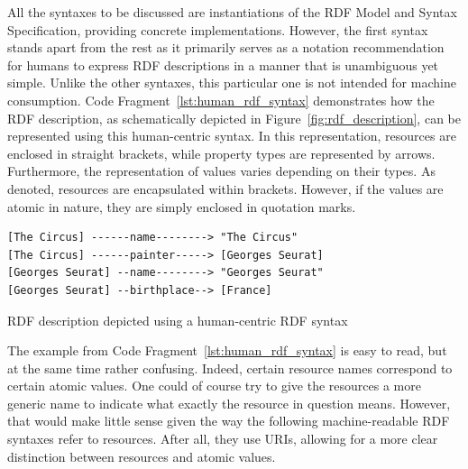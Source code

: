 All the syntaxes to be discussed are instantiations of the RDF Model and Syntax Specification, providing concrete implementations. However, the first syntax stands apart from the rest as it primarily serves as a notation recommendation for humans to express RDF descriptions in a manner that is unambiguous yet simple. Unlike the other syntaxes, this particular one is not intended for machine consumption. Code Fragment~\ref{lst:human_rdf_syntax} demonstrates how the RDF description, as schematically depicted in Figure~\ref{fig:rdf_description}, can be represented using this human-centric syntax. In this representation, resources are enclosed in straight brackets, while property types are represented by arrows. Furthermore, the representation of values varies depending on their types. As denoted, resources are encapsulated within brackets. However, if the values are atomic in nature, they are simply enclosed in quotation marks. \citep{miller1998introduction}

\begin{listing}[htbp]
    \begin{verbatim}
[The Circus] ------name--------> "The Circus"
[The Circus] ------painter-----> [Georges Seurat]
[Georges Seurat] --name--------> "Georges Seurat"
[Georges Seurat] --birthplace--> [France]
    \end{verbatim}
    \caption{RDF description depicted using a human-centric RDF syntax}
    \label{lst:human_rdf_syntax}
\end{listing}

The example from Code Fragment~\ref{lst:human_rdf_syntax} is easy to read, but at the same time rather confusing. Indeed, certain resource names correspond to certain atomic values. One could of course try to give the resources a more generic name to indicate what exactly the resource in question means. However, that would make little sense given the way the following machine-readable RDF syntaxes refer to resources. After all, they use URIs, allowing for a more clear distinction between resources and atomic values.

